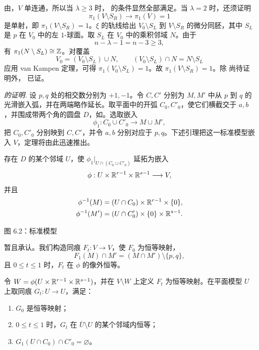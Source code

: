 \label{barden:page72}由，$V$ 单连通，所以当 $\lambda\geq3$ 时， 的条件显然全部满足。当 $\lambda=2$ 时，还须证明
\[
  \pi_1(V\setminus S_R)\longrightarrow\pi_1(V)=1
\]
是单射，即 $\pi_1(V\setminus S_R)=1$。$\xi$ 的轨线给出
$V_0\setminus S_L$ 到 $V\setminus S_R$ 的微分同胚，其中 $S_L$ 是 $p$ 在 $V_0$ 中的左 $1$-球面。取 $S_L$ 在 $V_0$ 中的乘积邻域 $N$。由于
\[
  n-\lambda-1=n-3\geq3,
\]
有 $\pi_1(N\setminus S_L)\cong\mathbb{Z}$。对覆盖
\[
  V_0=(V_0\setminus S_L)\cup N,
  \qquad
  (V_0\setminus S_L)\cap N=N\setminus S_L
\]
应用 van Kampen 定理，可得 $\pi_1(V_0\setminus S_L)=1$。故 $\pi_1(V\setminus S_R)=1$。除 尚待证明外， 已证。\label{barden:page73}
\EndProof

\par\medskip\noindent\textit{ 的证明.}\quad
设 $p,q$ 处的相交数分别为 $+1,-1$。令 $C,C'$ 分别为 $M,M'$ 中从 $p$ 到 $q$ 的光滑嵌入弧，并在两端略作延长。取平面中的开弧 $C_0,C'_0$，使它们横截交于 $a,b$，并围成带两个角的圆盘 $D$，如。选取嵌入
\[
  \phi_1:C_0\cup C'_0\longrightarrow M\cup M',
\]
把 $C_0,C'_0$ 分别映到 $C,C'$，并令 $a,b$ 分别对应于 $p,q$。下述引理把这一标准模型嵌入 $V$，定理将由此迅速推出。

存在 $D$ 的某个邻域 $U$，使
$\phi_1|_{U\cap(C_0\cup C'_0)}$ 延拓为嵌入
\[
  \phi:U\times\mathbb{R}^{r-1}\times\mathbb{R}^{s-1}\longrightarrow V,
\]
并且
\begin{align*}
  \phi^{-1}(M)&=(U\cap C_0)\times\mathbb{R}^{r-1}\times\{0\},\\
  \phi^{-1}(M')&=(U\cap C'_0)\times\{0\}\times\mathbb{R}^{s-1}.
\end{align*}

\begin{center}
  \FigSixTwo

  \label{fig:6.2}图 6.2：标准模型
\end{center}

暂且承认。我们构造同痕 $F_t:V\to V$，使 $F_0$ 为恒等映射，
\[
  F_1(M)\cap M'=(M\cap M')\setminus\{p,q\},
\]
且 $0\leq t\leq1$ 时，$F_t$ 在 $\phi$ 的像外恒等。

令 $W=\phi(U\times\mathbb{R}^{r-1}\times\mathbb{R}^{s-1})$，并在 $V\setminus W$ 上定义 $F_t$ 为恒等映射。在平面模型 $U$ 上取同痕 $G_t:U\to U$，满足：
\begin{enumerate}[label=\arabic*)]
  \item $G_0$ 是恒等映射；
  \item $0\leq t\leq1$ 时，$G_t$ 在 $\overline U\setminus U$ 的某个邻域内恒等；
  \item $G_1(U\cap C_0)\cap C'_0=\varnothing$。
\end{enumerate}

